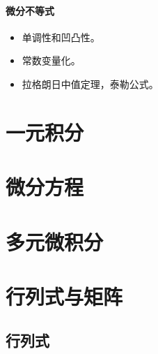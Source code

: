 \documentclass[
12pt, %
a4paper, 
oneside, %
headinclude,footinclude, %
]{scrartcl}
\begin{document}
\paragraph{微分不等式}
\begin{itemize}
\item 单调性和凹凸性。
\item 常数变量化。
\item 拉格朗日中值定理，泰勒公式。
\end{itemize}
\section{一元积分}
\subsection{}
\section{微分方程}
\subsection{}
\section{多元微积分}
\subsection{}
\section{行列式与矩阵}
\subsection{行列式}
\end{document}
